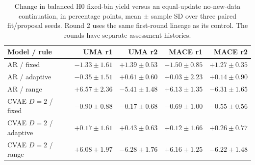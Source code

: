 \begin{table}[htbp]
\centering\small
\caption{Change in balanced H0 fixed-bin yield versus an equal-update no-new-data continuation, in percentage points, mean $\pm$ sample SD over three paired fit/proposal seeds. Round 2 uses the same first-round lineage as its control. The rounds have separate assessment histories.}
\begin{tabular}{lrrrr}\toprule
Model / rule & UMA r1 & UMA r2 & MACE r1 & MACE r2\\\midrule
AR / fixed & $-1.33\pm1.61$ & $+1.39\pm0.53$ & $-1.50\pm0.85$ & $+1.27\pm0.35$\\
AR / adaptive & $-0.35\pm1.51$ & $+0.61\pm0.60$ & $+0.03\pm2.23$ & $+0.14\pm0.90$\\
AR / range & $+6.57\pm2.36$ & $-5.41\pm1.48$ & $+6.13\pm1.35$ & $-6.31\pm1.65$\\
CVAE $D=2$ / fixed & $-0.90\pm0.88$ & $-0.17\pm0.68$ & $-0.69\pm1.00$ & $-0.55\pm0.56$\\
CVAE $D=2$ / adaptive & $+0.17\pm1.61$ & $+0.43\pm0.63$ & $+0.12\pm1.66$ & $+0.26\pm0.77$\\
CVAE $D=2$ / range & $+6.08\pm1.97$ & $-6.28\pm1.76$ & $+6.16\pm1.25$ & $-6.22\pm1.48$\\
\bottomrule\end{tabular}
\end{table}
